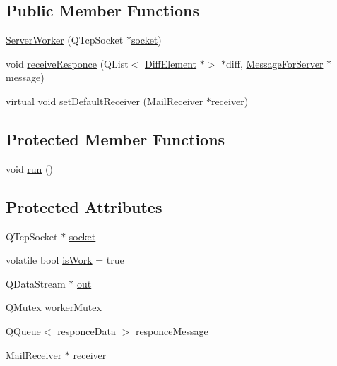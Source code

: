 \subsection*{Public Member Functions}
\begin{DoxyCompactItemize}
\item 
\hyperlink{a00185_aa8aee43d415cf337417a1d1f180ef03a}{Server\+Worker} (Q\+Tcp\+Socket $\ast$\hyperlink{a00185_a8f7ef6413cb2697dff4a71835fa5b93d}{socket})
\item 
void \hyperlink{a00185_a2cfa275ffeff3aeee19058e8155763f5}{receive\+Responce} (Q\+List$<$ \hyperlink{a00141}{Diff\+Element} $\ast$$>$ $\ast$diff, \hyperlink{a00121}{Message\+For\+Server} $\ast$message)
\item 
virtual void \hyperlink{a00205_aa85db0004c26606c5ac294e5de000b96}{set\+Default\+Receiver} (\hyperlink{a00197}{Mail\+Receiver} $\ast$\hyperlink{a00205_aa57ce2f74f8ad76abb38974f85b97ac5}{receiver})
\end{DoxyCompactItemize}
\subsection*{Protected Member Functions}
\begin{DoxyCompactItemize}
\item 
void \hyperlink{a00185_a8b4f9a11d13f0b4990ae72f87da010df}{run} ()
\end{DoxyCompactItemize}
\subsection*{Protected Attributes}
\begin{DoxyCompactItemize}
\item 
Q\+Tcp\+Socket $\ast$ \hyperlink{a00185_a8f7ef6413cb2697dff4a71835fa5b93d}{socket}
\item 
volatile bool \hyperlink{a00185_a237b637e43a66980b16463bab0b38ce4}{is\+Work} = true
\item 
Q\+Data\+Stream $\ast$ \hyperlink{a00185_aa17ea4dcd487fd8bd6aab748d496a561}{out}
\item 
Q\+Mutex \hyperlink{a00185_a7284c375ebf78a1dc24fbd801755e783}{worker\+Mutex}
\item 
Q\+Queue$<$ \hyperlink{a00189}{responce\+Data} $>$ \hyperlink{a00185_ac3d49b227a605c95f42569531f8dbe89}{responce\+Message}
\item 
\hyperlink{a00197}{Mail\+Receiver} $\ast$ \hyperlink{a00205_aa57ce2f74f8ad76abb38974f85b97ac5}{receiver}
\end{DoxyCompactItemize}

